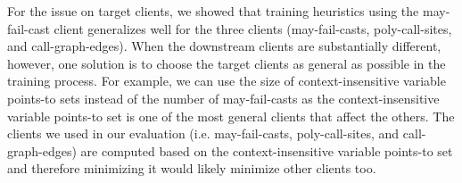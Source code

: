 For the issue on target clients, we showed that training heuristics using the may-fail-cast client
generalizes well for the three clients (may-fail-casts, poly-call-sites, and call-graph-edges).
When the downstream clients are substantially different, however,
one solution is to choose the target clients as general as possible in the training process. For example, we can use the size of context-insensitive variable points-to sets instead of the number of may-fail-casts as the context-insensitive variable points-to set is one of the most general clients that affect the others.
The clients we used in our evaluation (i.e. may-fail-casts, poly-call-sites, and call-graph-edges) are computed based on the context-insensitive variable points-to set and therefore minimizing it would likely minimize other clients too.
%
%
%






